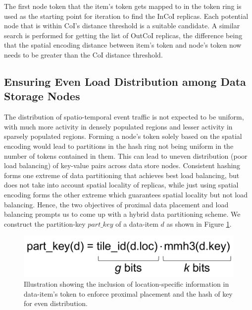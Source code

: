 The first node token that the item's token gets mapped to in the token ring is used as the starting point for iteration to find the InCoI replicas. Each potential node that is within CoI's distance threshold is a suitable candidate. A similar search is performed for getting the list of OutCoI replicas, the difference being that the spatial encoding distance between item's token and node's token now needs to be greater than the CoI distance threshold.

\subsection{Ensuring Even Load Distribution among Data Storage Nodes}
\par The distribution of spatio-temporal event traffic is not expected to be uniform, with much more activity in densely populated regions and lesser activity in sparsely populated regions. Forming a node's token solely based on the spatial encoding would lead to partitions in the hash ring not being uniform in the number of tokens contained in them. This can lead to uneven distribution (poor load balancing) of key-value pairs across data store nodes. Consistent hashing forms one extreme of data partitioning that achieves best load balancing, but does not take into account spatial locality of replicas, while just using spatial encoding forms the other extreme which guarantees spatial locality but not load balancing.
Hence, the two objectives of proximal data placement and load balancing prompts us to come up with a hybrid data partitioning scheme. We construct the partition-key $part\_key$ of a data-item $d$ as shown in Figure \ref{fig:partitionkey}.
\begin{figure}[h]
\centering
\includegraphics[width=0.75\columnwidth]{figures/fogstore/partition_key.pdf}
\caption{Illustration showing the inclusion of location-specific information in data-item's token to enforce proximal placement and the hash of key for even distribution.}
\label{fig:partitionkey}
\end{figure}


